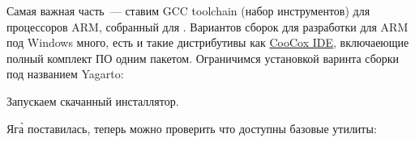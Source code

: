 \label{gnuchaininstall}

\bigskip
Самая важная часть\ --- ставим GCC toolchain (набор инструментов)
для процессоров ARM, собранный для .
Вариантов сборок для разработки для ARM под Windows много, есть и такие
дистрибутивы как \href{http://www.coocox.org/}{CooCox IDE}, включаеющие полный
комплект ПО одним пакетом. Ограничимся установкой варинта сборки под названием
Yagarto:

\bigskip{}

\bigskip
Запускаем скачанный инсталлятор.

\bigskip{}






\bigskip Яг\`{а} поставилась, теперь можно проверить что доступны базовые 
утилиты:

